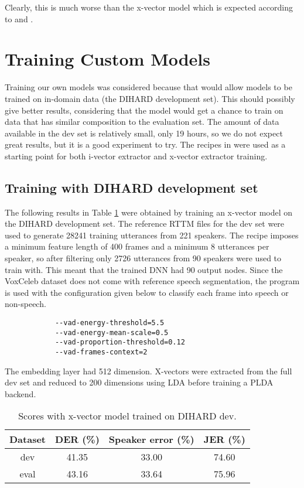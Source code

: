 		Clearly, this is much worse than the x-vector model which is expected according to \cite{snyder2018x} and \cite{sell2018diarization}.
	
	\section{Training Custom Models}
	Training our own models was considered because that would allow models to be trained on in-domain data (the DIHARD development set). This should possibly give better results, considering that the model would get a chance to train on data that has similar composition to the evaluation set. The amount of data available in the dev set is relatively small, only 19 hours, so we do not expect great results, but it is a good experiment to try. The recipes in  were used as a starting point for both i-vector extractor and x-vector extractor training.
	
		\subsection{Training with DIHARD development set}
			The following results in Table \ref{table-dev-xvec} were obtained by training an x-vector model on the DIHARD development set. The reference RTTM files for the dev set were used to generate 28241 training utterances from 221 speakers. The recipe imposes a minimum feature length of 400 frames and a minimum 8 utterances per speaker, so after filtering only 2726 utterances from 90 speakers were used to train with. This meant that the trained DNN had 90 output nodes. Since the VoxCeleb dataset does not come with reference speech segmentation, the program  is used with the configuration given below to classify each frame into speech or non-speech.
			
			\begin{verbatim}
			--vad-energy-threshold=5.5
			--vad-energy-mean-scale=0.5
			--vad-proportion-threshold=0.12
			--vad-frames-context=2
			\end{verbatim}
			
			The embedding layer had 512 dimension. X-vectors were extracted from the full dev set and reduced to 200 dimensions using LDA before training a PLDA backend.
			
			\begin{table}[h]
				\centering
				\begin{tabular}{|c|c|c|c|}
					\hline
					Dataset & DER (\%) & Speaker error (\%) & JER (\%) \\
					\hline
					dev & 41.35 & 33.00 & 74.60 \\
					\hline
					eval & 43.16 & 33.64 & 75.96 \\
					\hline
				\end{tabular}
				\caption{Scores with x-vector model trained on DIHARD dev.}
				\label{table-dev-xvec}
			\end{table}
		
